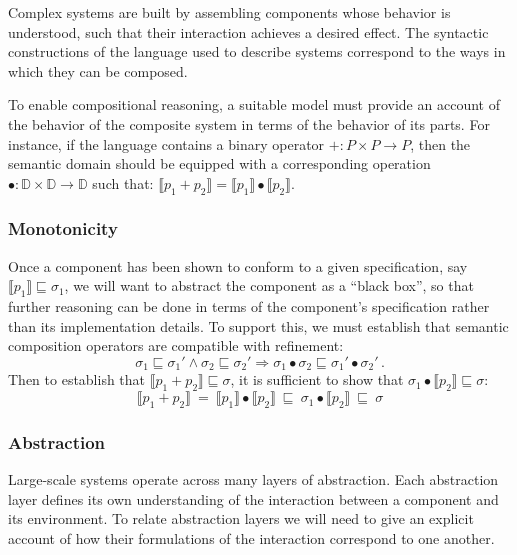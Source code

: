 \documentclass[acmsmall,timestamp,review]{acmart}
\begin{document}
Complex systems are built by assembling components
whose behavior is understood,
such that their interaction achieves a desired effect.
The syntactic constructions of
the language used to describe systems
correspond to the ways in which they can be composed.

To enable compositional reasoning,
a suitable model must provide an account of
the behavior of the composite system
in terms of the behavior of its parts.
For instance,
if the language contains a binary operator
${+} : P \times P \rightarrow P$,
then the semantic domain should be equipped with
a corresponding operation
${\bullet} : \mathbb{D} \times \mathbb{D} \rightarrow \mathbb{D}$
such that:
$\llbracket p_1 + p_2 \rrbracket =
 \llbracket p_1 \rrbracket \bullet \llbracket p_2 \rrbracket$.


\subsubsection{Monotonicity} %

Once a component has been shown to conform to a given specification,
say $\llbracket p_1 \rrbracket \sqsubseteq \sigma_1$,
we will want to abstract the component as a ``black box'',
so that further reasoning can be done in terms of
the component's specification rather than its implementation details.
To support this,
we must establish that semantic composition operators
are compatible with refinement:
\[ \sigma_1 \sqsubseteq \sigma_1' \wedge
   \sigma_2 \sqsubseteq \sigma_2' \Rightarrow
   \sigma_1 \bullet \sigma_2 \sqsubseteq \sigma_1' \bullet \sigma_2' \,. \]
Then to establish that
$\llbracket p_1 + p_2 \rrbracket \sqsubseteq \sigma$,
it is sufficient to show that
$\sigma_1 \bullet \llbracket p_2 \rrbracket \sqsubseteq \sigma$:
\[
   \llbracket p_1 + p_2 \rrbracket \: = \:
   \llbracket p_1 \rrbracket \bullet \llbracket p_2 \rrbracket \:\sqsubseteq\:
   \sigma_1 \bullet \llbracket p_2 \rrbracket \:\sqsubseteq\:
   \sigma
\]


\subsubsection{Abstraction} %

Large-scale systems operate across many layers of abstraction.
Each abstraction layer defines its own understanding of the interaction
between a component and its environment.
To relate abstraction layers we will need to give an explicit account
of how their formulations of the interaction correspond to one another.
\end{document}
